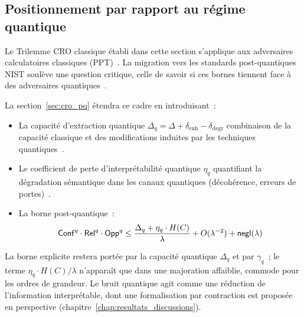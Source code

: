\subsection{Positionnement par rapport au r\'egime quantique}
\label{subsec:transition_postquantique}
\begin{sloppypar}
Le Trilemme CRO classique \'etabli dans cette section s'applique aux adversaires
calculatoires classiques (PPT)~\cite{Goldreich01,KatzLindell14}. La migration vers les standards post-quantiques
NIST soul\`eve une question critique, celle de savoir si ces bornes tiennent face \`a des
adversaires quantiques~\cite{NISTPQC,Watrous2009,Boneh2011,Zhandry}.

La section~\ref{sec:cro_pq} \'etendra ce cadre en introduisant~:

\begin{itemize}
\item La capacit\'e d'extraction quantique $\Delta_q = \Delta + \delta_{\text{enh}} - \delta_{\text{degr}}$
combinaison de la capacit\'e classique et des modifications induites par les
techniques quantiques~\cite{NielsenChuang2010,Wilde2017}.

\item Le coefficient de perte d'interpr\'etabilit\'e quantique $\eta_q$ quantifiant
la d\'egradation s\'emantique dans les canaux quantiques (d\'ecoh\'erence, erreurs de portes)~\cite{Zurek2003,Wootters1982}.

\item La borne post-quantique~:
\begin{equation}
\mathsf{Conf}^q \cdot \mathsf{Rel}^q \cdot \mathsf{Opp}^q \leq \frac{\Delta_q + \eta_q \cdot H(C)}{\lambda} + O(\lambda^{-2}) + \mathsf{negl}(\lambda)
\end{equation}
\end{itemize}

La borne explicite restera port\'ee par la capacit\'e quantique $\Delta_q$ et par
$\gamma_q$~; le terme $\eta_q \cdot H(C)/\lambda$ n'appara\^it que dans une
majoration affaiblie, commode pour les ordres de grandeur. Le bruit quantique
agit comme une r\'eduction de l'information interpr\'etable, dont une
formalisation par contraction est propos\'ee en perspective
(chapitre~\ref{chap:resultats_discussions}).
\end{sloppypar}

